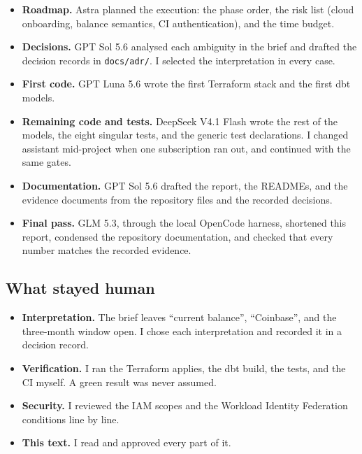 \documentclass[10pt,a4paper]{article}
\newcommand{\code}[1]{\nolinkurl{#1}}
\begin{document}
\begin{itemize}
  \item \textbf{Roadmap.} Astra planned the execution: the phase order,
        the risk list (cloud onboarding, balance semantics, CI
        authentication), and the time budget.
  \item \textbf{Decisions.} GPT Sol 5.6 analysed each ambiguity in the
        brief and drafted the decision records in \code{docs/adr/}. I
        selected the interpretation in every case.
  \item \textbf{First code.} GPT Luna 5.6 wrote the first Terraform
        stack and the first dbt models.
  \item \textbf{Remaining code and tests.} DeepSeek V4.1 Flash wrote the
        rest of the models, the eight singular tests, and the generic
        test declarations. I changed assistant mid-project when one
        subscription ran out, and continued with the same gates.
  \item \textbf{Documentation.} GPT Sol 5.6 drafted the report, the
        READMEs, and the evidence documents from the repository files
        and the recorded decisions.
  \item \textbf{Final pass.} GLM 5.3, through the local OpenCode
        harness, shortened this report, condensed the repository
        documentation, and checked that every number matches the
        recorded evidence.
\end{itemize}

\subsection{What stayed human}

\begin{itemize}
  \item \textbf{Interpretation.} The brief leaves ``current balance'',
        ``Coinbase'', and the three-month window open. I chose each
        interpretation and recorded it in a decision record.
  \item \textbf{Verification.} I ran the Terraform applies, the dbt
        build, the tests, and the CI myself. A green result was never
        assumed.
  \item \textbf{Security.} I reviewed the IAM scopes and the Workload
        Identity Federation conditions line by line.
  \item \textbf{This text.} I read and approved every part of it.
\end{itemize}
\end{document}
